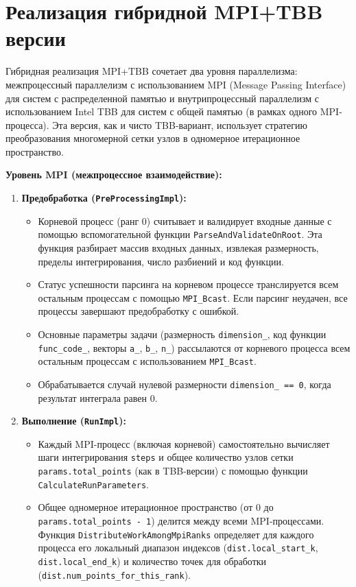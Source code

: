 \documentclass[a4paper,12pt]{article}
\begin{document}
\newpage
\section{Реализация гибридной MPI+TBB версии}
\label{sec:mpi_tbb_implementation}

Гибридная реализация MPI+TBB сочетает два уровня параллелизма: межпроцессный параллелизм с использованием MPI (Message Passing Interface) для систем с распределенной памятью и внутрипроцессный параллелизм с использованием Intel TBB для систем с общей памятью (в рамках одного MPI-процесса). Эта версия, как и чисто TBB-вариант, использует стратегию преобразования многомерной сетки узлов в одномерное итерационное пространство.

\textbf{Уровень MPI (межпроцессное взаимодействие):}
\begin{enumerate}
    \item \textbf{Предобработка (\texttt{PreProcessingImpl}):}
        \begin{itemize}
            \item Корневой процесс (ранг 0) считывает и валидирует входные данные с помощью вспомогательной функции \texttt{ParseAndValidateOnRoot}. Эта функция разбирает массив входных данных, извлекая размерность, пределы интегрирования, число разбиений и код функции.
            \item Статус успешности парсинга на корневом процессе транслируется всем остальным процессам с помощью \texttt{MPI\_Bcast}. Если парсинг неудачен, все процессы завершают предобработку с ошибкой.
            \item Основные параметры задачи (размерность \texttt{dimension\_}, код функции \texttt{func\_code\_}, векторы \texttt{a\_}, \texttt{b\_}, \texttt{n\_}) рассылаются от корневого процесса всем остальным процессам с использованием \texttt{MPI\_Bcast}.
            \item Обрабатывается случай нулевой размерности \texttt{dimension\_ == 0}, когда результат интеграла равен 0.
        \end{itemize}
    \item \textbf{Выполнение (\texttt{RunImpl}):}
        \begin{itemize}
            \item Каждый MPI-процесс (включая корневой) самостоятельно вычисляет шаги интегрирования \texttt{steps} и общее количество узлов сетки \texttt{params.total\_points} (как в TBB-версии) с помощью функции \texttt{CalculateRunParameters}.
            \item Общее одномерное итерационное пространство (от $0$ до \texttt{params.total\_points - 1}) делится между всеми MPI-процессами. Функция \texttt{DistributeWorkAmongMpiRanks} определяет для каждого процесса его локальный диапазон индексов (\texttt{dist.local\_start\_k}, \texttt{dist.local\_end\_k}) и количество точек для обработки (\texttt{dist.num\_points\_for\_this\_rank}).

\end{itemize}
\end{enumerate}
\end{document}
